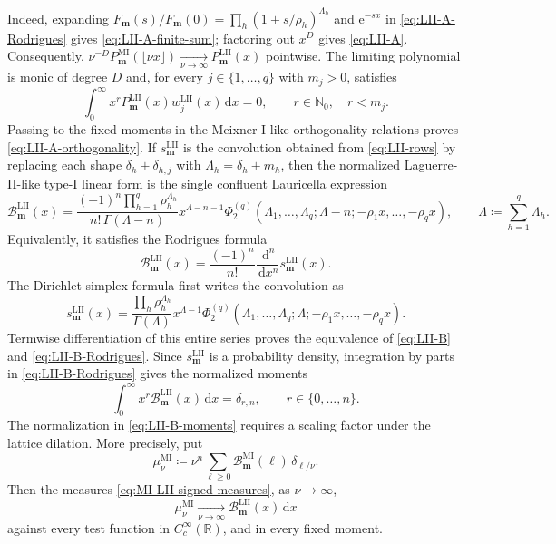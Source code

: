 \documentclass[10pt]{amsart}
\newcommand{\Nzero}{\mathbb N_0}
\newcommand{\R}{\mathbb R}
\newcommand{\e}{\mathrm e}
\newcommand{\dd}{\,\mathrm d}
\newcommand{\mm}{\boldsymbol m}
\theoremstyle{plain}
\theoremstyle{definition}
\theoremstyle{remark}
\begin{document}
Indeed, expanding
\(F_{\mm}(s)/F_{\mm}(0)=
\prod_h(1+s/\rho_h)^{\Lambda_h}\) and \(\e^{-sx}\) in
\eqref{eq:LII-A-Rodrigues} gives
\eqref{eq:LII-A-finite-sum}; factoring out \(x^D\) gives
\eqref{eq:LII-A}.
Consequently,
\(\nu^{-D}P_{\mm}^{\mathrm{MI}}(\lfloor\nu x\rfloor)
\xrightarrow[\nu\to\infty]{}P_{\mm}^{\mathrm{LII}}(x)\) pointwise.
The limiting polynomial is monic of degree \(D\) and, for every
\(j\in\{1,\ldots,q\}\) with \(m_j>0\), satisfies
\begin{equation}
 \int_0^\infty x^rP_{\mm}^{\mathrm{LII}}(x)
 w_j^{\mathrm{LII}}(x)\dd x=0,
 \qquad r\in\Nzero,\quad r<m_j.
 \label{eq:LII-A-orthogonality}
\end{equation}
Passing to the fixed moments in the Meixner-I-like orthogonality relations
proves \eqref{eq:LII-A-orthogonality}.
If \(s_{\mm}^{\mathrm{LII}}\) is the convolution obtained from
\eqref{eq:LII-rows} by replacing each shape \(\delta_h+\delta_{h,j}\)
with \(\Lambda_h=\delta_h+m_h\), then the normalized Laguerre-II-like
type-I linear form is the single confluent Lauricella expression
\begin{equation}
 \mathcal B_{\mm}^{\mathrm{LII}}(x)
 =\frac{(-1)^n\prod_{h=1}^q\rho_h^{\Lambda_h}}
 {n!\,\Gamma(\Lambda-n)}
 x^{\Lambda-n-1}
 \Phi_2^{(q)}
 \left(
 \Lambda_1,\ldots,\Lambda_q;\Lambda-n;
 -\rho_1x,\ldots,-\rho_qx
 \right),
 \qquad \Lambda\coloneq\sum_{h=1}^q\Lambda_h.
 \label{eq:LII-B}
\end{equation}
Equivalently, it satisfies the Rodrigues formula
\begin{equation}
 \mathcal B_{\mm}^{\mathrm{LII}}(x)
 =\frac{(-1)^n}{n!}\frac{\dd^n}{\dd x^n}
 s_{\mm}^{\mathrm{LII}}(x).
 \label{eq:LII-B-Rodrigues}
\end{equation}
The Dirichlet-simplex formula first writes the convolution as
\[
 s_{\mm}^{\mathrm{LII}}(x)
 =\frac{\prod_h\rho_h^{\Lambda_h}}
 {\Gamma(\Lambda)}x^{\Lambda-1}
 \Phi_2^{(q)}
 (\Lambda_1,\ldots,\Lambda_q;\Lambda;
 -\rho_1x,\ldots,-\rho_qx).
\]
Termwise differentiation of this entire series proves the equivalence of
\eqref{eq:LII-B} and \eqref{eq:LII-B-Rodrigues}.
Since \(s_{\mm}^{\mathrm{LII}}\) is a probability density, integration by
parts in \eqref{eq:LII-B-Rodrigues} gives the normalized moments
\begin{equation}
 \int_0^\infty x^r\mathcal B_{\mm}^{\mathrm{LII}}(x)\dd x
 =\delta_{r,n},\qquad r\in\{0,\ldots,n\}.
 \label{eq:LII-B-moments}
\end{equation}
The normalization in \eqref{eq:LII-B-moments} requires a scaling factor
under the lattice dilation. More precisely, put
\begin{equation}
 \mu_{\nu}^{\mathrm{MI}}
 \coloneq\nu^n\sum_{\ell\ge0}
 \mathcal B_{\mm}^{\mathrm{MI}}(\ell)\,\delta_{\ell/\nu}.
 \label{eq:MI-LII-signed-measures}
\end{equation}
Then the measures \eqref{eq:MI-LII-signed-measures}, as \(\nu\to\infty\),
\begin{equation}
 \mu_{\nu}^{\mathrm{MI}}\xrightarrow[\nu\to\infty]{}
 \mathcal B_{\mm}^{\mathrm{LII}}(x)\dd x
 \label{eq:MI-LII-B-limit}
\end{equation}
against every test function in \(C_c^\infty(\R)\), and in every fixed
moment.
\end{document}
